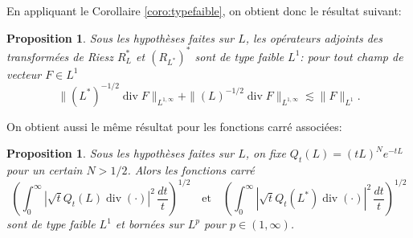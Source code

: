 \documentclass[11pt]{amsart}
\newtheorem{proposition}[theorem]{Proposition}
\DeclareMathOperator{\dive}{div}
\begin{document}
En appliquant le Corollaire \ref{coro:typefaible}, on obtient donc le r\'esultat suivant:

\begin{proposition} \label{prop:dualriesz} Sous les hypoth\`eses faites sur $L$, les op\'erateurs adjoints des transform\'ees de Riesz $R_L^*$ et $ (R_{L^*})^*$ sont de type faible $L^1$: pour tout champ de vecteur $F\in L^1$
$$ \|(L^*)^{-1/2} \dive F\|_{L^{1,\infty}} + \|(L)^{-1/2} \dive F\|_{L^{1,\infty}} \lesssim \|F\|_{L^1}.$$
\end{proposition}


On obtient aussi le m\^eme r\'esultat pour les fonctions carr\'e associ\'ees: 
\begin{proposition} \label{prop:dualcarre} Sous les hypoth\`eses faites sur $L$, on fixe $Q_t(L)=(tL)^Ne^{-tL}$ pour un certain $N>1/2$. Alors les fonctions carr\'e
$$ \left(\int_0^\infty \left| \sqrt{t} Q_t(L) \dive(\cdot) \right|^2 \, \frac{dt}{t} \right)^{1/2} \quad \textrm{et} \quad \left(\int_0^\infty \left| \sqrt{t} Q_t(L^*) \dive(\cdot) \right|^2 \, \frac{dt}{t} \right)^{1/2}$$
sont de type faible $L^1$ et born\'ees sur $L^p$ pour $p\in(1,\infty)$.
\end{proposition}
\end{document}
